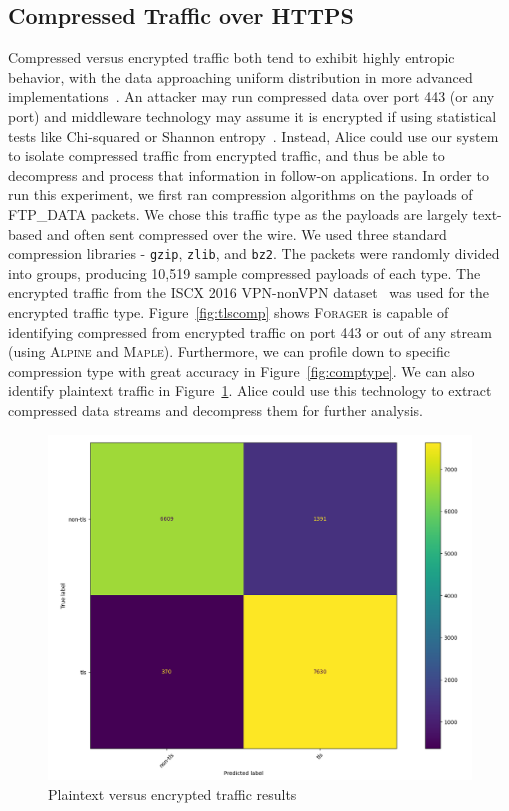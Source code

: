 \subsection{Compressed Traffic over HTTPS}
Compressed versus encrypted traffic both tend to exhibit highly entropic behavior, with the data approaching uniform distribution in more advanced implementations~\cite{hedge}. An attacker may run compressed data over port 443 (or any port) and middleware technology may assume it is encrypted if using statistical tests like Chi-squared or Shannon entropy~\cite{gaspari2020encod}. Instead, Alice could use our system to isolate compressed traffic from encrypted traffic, and thus be able to decompress and process that information in follow-on applications. In order to run this experiment, we first ran compression algorithms on the payloads of FTP\_DATA packets. We chose this traffic type as the payloads are largely text-based and often sent compressed over the wire. We used three standard compression libraries - \texttt{gzip}, \texttt{zlib}, and \texttt{bz2}. The packets were randomly divided into groups, producing 10,519 sample compressed payloads of each type. The encrypted traffic from the ISCX 2016 VPN-nonVPN dataset~\cite{iscx-vpn-paper} was used for the encrypted traffic type. Figure~\ref{fig:tlscomp} shows \textsc{Forager} is capable of identifying compressed from encrypted traffic on port 443 or out of any stream (using \textsc{Alpine} and \textsc{Maple}). Furthermore, we can profile down to specific compression type with great accuracy in Figure~\ref{fig:comptype}. We can also identify plaintext traffic in Figure~\ref{fig:tlsnontls}. Alice could use this technology to extract compressed data streams and decompress them for further analysis.

\begin{figure} [ht!]
\centering
\includegraphics[scale=0.4]{chapters/7/img/tls_nontls.png}
\caption{Plaintext versus encrypted traffic results}
\label{fig:tlsnontls}
\end{figure}

